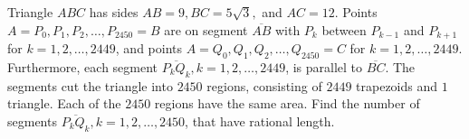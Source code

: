 Triangle $ABC$ has sides $AB=9,BC = 5\sqrt{3},$ and $AC=12$. Points $A=P_0, P_1, P_2, \dots, P_{2450} = B$ are on segment $\overline{AB}$ with $P_k$ between $P_{k-1}$ and $P_{k+1}$ for $k=1,2,\dots,2449$,  and points $A=Q_0, Q_1, Q_2, \dots ,Q_{2450} = C$ for $k=1,2,\dots,2449$. Furthermore, each segment $\overline{P_kQ_k}, k=1,2,\dots,2449$,  is parallel to $\overline{BC}$. The segments cut the triangle into $2450$ regions, consisting of $2449$ trapezoids and $1$ triangle. Each of the $2450$ regions have the same area. Find the number of segments $\overline{P_kQ_k}, k=1,2 ,\dots,2450$,  that have rational length.